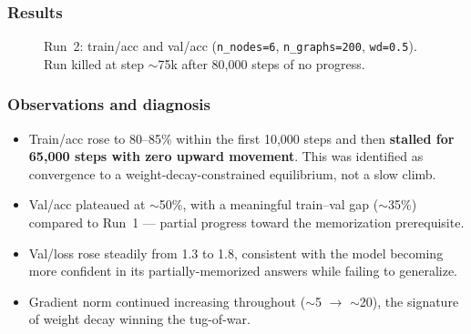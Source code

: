 \documentclass[11pt, a4paper]{article}
\begin{document}
\subsubsection{Results}

\begin{figure}[H]
\centering
{}
\caption{Run~2: train/acc and val/acc (\texttt{n\_nodes=6}, \texttt{n\_graphs=200},
  \texttt{wd=0.5}). Run killed at step $\sim$75k after 80{,}000 steps of no
  progress.}
\end{figure}

\subsubsection{Observations and diagnosis}

\begin{itemize}[noitemsep]
  \item Train/acc rose to 80--85\% within the first 10{,}000 steps and then
        \textbf{stalled for 65{,}000 steps with zero upward movement}. This
        was identified as convergence to a weight-decay-constrained equilibrium,
        not a slow climb.
  \item Val/acc plateaued at $\sim$50\%, with a meaningful train--val gap
        ($\sim$35\%) compared to Run~1 --- partial progress toward the
        memorization prerequisite.
  \item Val/loss rose steadily from 1.3 to 1.8, consistent with the model
        becoming more confident in its partially-memorized answers while
        failing to generalize.
  \item Gradient norm continued increasing throughout ($\sim$5 $\to$ $\sim$20),
        the signature of weight decay winning the tug-of-war.
\end{itemize}
\end{document}
